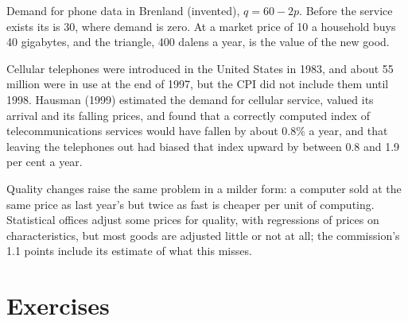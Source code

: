 \begin{omfigure}

{\small Demand for phone data in Brenland (invented), $q = 60 - 2p$. Before the
service exists its  is 30, where demand is zero. At a market
price of 10 a household buys 40 gigabytes, and the triangle, 400 dalens a
year, is the value of the new good.}
\end{omfigure}

\begin{record}
Cellular telephones were introduced in the United States in 1983, and about
55 million were in use at the end of 1997, but the CPI did not include them
until 1998. %
Hausman (1999) estimated the demand for cellular service, valued its
arrival and its falling prices, and found that a correctly computed index
of telecommunications services would have fallen by about $0.8\%$ a year,
and that leaving the telephones out had biased that index upward by between
0.8 and 1.9 per cent a year. %
\end{record}

Quality changes raise the same problem in a milder form: a computer sold
at the same price as last year's but twice as fast is cheaper per unit of
computing. Statistical offices adjust some prices for quality, with
regressions of prices on characteristics, but most goods are adjusted
little or not at all; the commission's 1.1 points include its estimate of
what this misses.

\section*{Exercises}\label{sec:b1:consumer-welfare:exercises}

